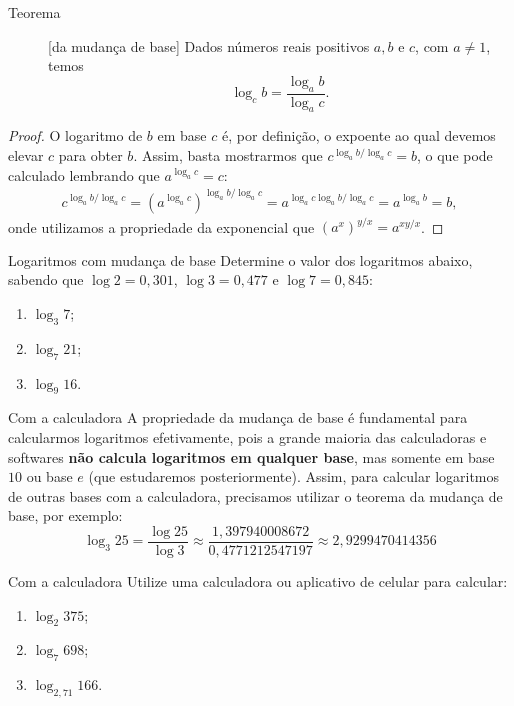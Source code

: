 \label{secao_mud_base}


\begin{description}
\item[Teorema]\label{teo_mud_base}
[da mudança de base] Dados números reais positivos $a,b$ e $c$, com $a \neq 1$, temos
$$
\log_c b = \frac{\log_a b}{\log_a c}.
$$
\end{description}
\begin{proof}
O logaritmo de $b$ em base $c$ é, por definição, o expoente ao qual devemos elevar $c$ para obter $b$. Assim, basta mostrarmos que $c^{\log_a b/\log_a c} =b$, o que pode calculado lembrando que $a^{\log_a c}=c$:
\begin{align*}
c^{\log_a b/\log_a c} = (a^{\log_a c})^{\log_a b/\log_a c} =a^{\log_a c\log_a b/\log_a c} =  a^{\log_a b} = b,
\end{align*}
onde utilizamos a propriedade da exponencial que $(a^x)^{y/x} = a^{xy/x}$.
\end{proof}



\begin{task}{Logaritmos com mudança de base}
Determine o valor dos logaritmos abaixo, sabendo que $\log 2 = 0{,}301$, $\log 3 = 0{,}477$ e $\log 7 = 0{,}845$:
\begin{enumerate}
\item $\log_3 7$;
\item $\log_7 21$;
\item $\log_9 16$.
\end{enumerate}
\end{task}


\begin{observation}{Com a calculadora}
A propriedade da mudança de base é fundamental para calcularmos logaritmos efetivamente, pois a grande maioria das calculadoras e softwares \textbf{não calcula logaritmos em qualquer base}, mas somente em base $10$ ou base $e$ (que estudaremos posteriormente). Assim, para calcular logaritmos de outras bases com a calculadora, precisamos utilizar o teorema da mudança de base, por exemplo:
$$
\log_3 25 = \frac{\log 25}{\log 3} \approx \frac{1{,}397940008672}{0{,}4771212547197} \approx 2{,}9299470414356
$$
\end{observation}


\begin{task}{Com a calculadora}
Utilize uma calculadora ou aplicativo de celular para calcular:
\begin{enumerate}
\item $\log_2 375$;
\item $\log_7 698$;
\item $\log_{2{,}71} 166$.
\end{enumerate}
\end{task}

